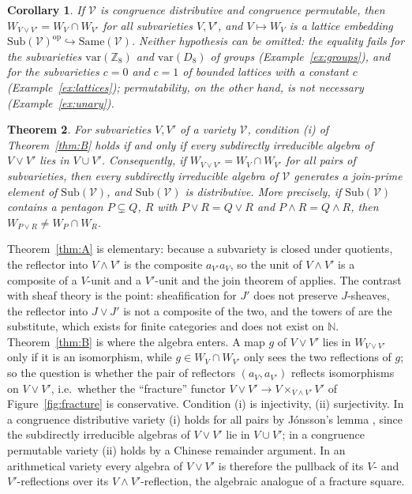 \documentclass[11pt]{amsart}
\newtheorem{thm}{Theorem}[section]
\newtheorem{cor}[thm]{Corollary}
\theoremstyle{definition}
\newcommand{\Same}{\mathrm{Same}}
\newcommand{\Sub}{\mathrm{Sub}}
\newcommand{\sV}{\mathcal V}
\newcommand{\var}{\mathrm{var}}
\begin{document}
\begin{cor}\label{cor:arith}
If $\sV$ is congruence distributive and congruence permutable, then
$W_{V\vee V'}=W_V\cap W_{V'}$ for all subvarieties $V,V'$, and
$V\mapsto W_V$ is a lattice embedding $\Sub(\sV)^{\mathrm{op}}\hookrightarrow\Same(\sV)$.
Neither hypothesis can be omitted: the equality fails for the subvarieties
$\var(\mathbb Z_8)$ and $\var(D_8)$ of groups (Example~\ref{ex:groups}), and
for the subvarieties $c=0$ and $c=1$ of bounded lattices with a constant $c$
(Example~\ref{ex:lattices}); permutability, on the other hand, is not necessary
(Example~\ref{ex:unary}).
\end{cor}

\begin{thm}\label{thm:C}
For subvarieties $V,V'$ of a variety $\sV$, condition (i) of Theorem~\ref{thm:B}
holds if and only if every subdirectly irreducible algebra of $V\vee V'$ lies in
$V\cup V'$. Consequently, if $W_{V\vee V'}=W_V\cap W_{V'}$ for all pairs of
subvarieties, then every subdirectly irreducible algebra of $\sV$ generates a
join-prime element of $\Sub(\sV)$, and $\Sub(\sV)$ is distributive. More
precisely, if $\Sub(\sV)$ contains a pentagon $P\subsetneq Q$, $R$ with
$P\vee R=Q\vee R$ and $P\wedge R=Q\wedge R$, then $W_{P\vee R}\ne W_P\cap W_R$.
\end{thm}

Theorem~\ref{thm:A} is elementary: because a subvariety is closed under
quotients, the reflector into $V\wedge V'$ is the composite $a_{V'}a_V$, so the
unit of $V\wedge V'$ is a composite of a $V$-unit and a $V'$-unit and the join
theorem of \cite{Postnikov} applies. The contrast with sheaf theory is the
point: sheafification for $J'$ does not preserve $J$-sheaves, the reflector
into $J\vee J'$ is not a composite of the two, and the towers of
\cite{Topjoin,Finitejoin} are the substitute, which exists for finite
categories and does not exist on $\mathbb N$. Theorem~\ref{thm:B} is where the
algebra enters. A map $g$ of $V\vee V'$ lies in $W_{V\vee V'}$ only if it is an
isomorphism, while $g\in W_V\cap W_{V'}$ only sees the two reflections of $g$;
so the question is whether the pair of reflectors $(a_V,a_{V'})$ reflects
isomorphisms on $V\vee V'$, i.e.\ whether the ``fracture'' functor
$V\vee V'\to V\times_{V\wedge V'}V'$ of Figure~\ref{fig:fracture} is
conservative. Condition (i) is injectivity, (ii) surjectivity. In a
congruence distributive variety (i) holds for all pairs by Jónsson's lemma
\cite{Jonsson}, since the subdirectly irreducible algebras of $V\vee V'$ lie in
$V\cup V'$; in a congruence permutable variety (ii) holds by a Chinese remainder
argument. In an arithmetical variety every algebra of $V\vee V'$ is therefore
the pullback of its $V$- and $V'$-reflections over its $V\wedge V'$-reflection,
the algebraic analogue of a fracture square.
\end{document}
